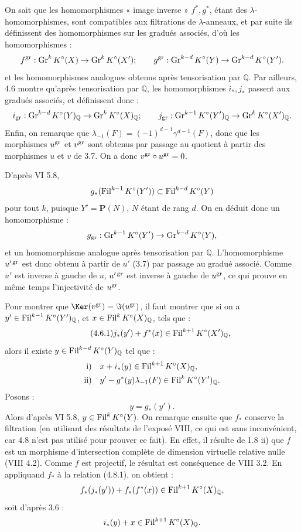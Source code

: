 On sait que les homomorphismes « image inverse » \(f^*,g^*\), étant des \(\lambda\)-homomorphismes, sont compatibles aux filtrations de \(\lambda\)-anneaux, et par suite ils définissent des homomorphismes sur les gradués associés, d'où les homomorphismes :
\[
  f^{\operatorname{gr}}:\operatorname{Gr}^kK^\circ(X)\to\operatorname{Gr}^kK^\circ(X');
  \qquad
  g^{\operatorname{gr}}:\operatorname{Gr}^{k-d}K^\circ(Y)\to\operatorname{Gr}^{k-d}K^\circ(Y').
\]
et les homomorphismes analogues obtenus après tensorisation par \(\mathbb Q\). Par ailleurs, 4.6 montre qu'après tensorisation par \(\mathbb Q\), les homomorphismes \(i_*,j_*\) passent aux gradués associés, et définissent
donc :
\[
  i_{\operatorname{gr}}:\operatorname{Gr}^{k-d}K^\circ(Y)_{\mathbb Q}
  \to \operatorname{Gr}^{k}K^\circ(X)_{\mathbb Q};
  \qquad
  j_{\operatorname{gr}}:\operatorname{Gr}^{k-1}K^\circ(Y')_{\mathbb Q}
  \to \operatorname{Gr}^{k}K^\circ(X')_{\mathbb Q}.
\]
Enfin, on remarque que \(\lambda_{-1}(F)=(-1)^{d-1}\gamma^{d-1}(F)\), donc que les morphismes \(u^{\operatorname{gr}}\) et \(v^{\operatorname{gr}}\) sont obtenus par passage au quotient à partir des morphismes \(u\) et \(v\) de 3.7. On a donc \(v^{\operatorname{gr}}\circ u^{\operatorname{gr}}=0\).

D'après VI 5.8,
\[
  g_*(\operatorname{Fil}^{k-1}K^\circ(Y'))\subset \operatorname{Fil}^{k-d}K^\circ(Y)
\]
pour tout \(k\), puisque \(Y'=\mathbf P(N)\), \(N\) étant de rang \(d\). On en déduit donc un homomorphisme :
\[
  g_{\operatorname{gr}}:\operatorname{Gr}^{k-1}K^\circ(Y')
  \to\operatorname{Gr}^{k-d}K^\circ(Y),
\]
et un homomorphisme analogue après tensorisation par \(\mathbb Q\). L'homomorphisme \(u'^{\operatorname{gr}}\) est donc obtenu à partir de \(u'\) (3.7) par passage au gradué associé. Comme \(u'\) est inverse à gauche de \(u\), \(u'^{\operatorname{gr}}\) est inverse à gauche de \(u^{\operatorname{gr}}\), ce qui prouve en même temps l'injectivité de \(u^{\operatorname{gr}}\).

Pour montrer que \(\Ker(v^{\gr})=\Im(u^{\gr})\), il faut montrer que si on a \(y'\in\operatorname{Fil}^{k-1}K^\circ(Y')_{\mathbb Q}\), et \(x\in\operatorname{Fil}^kK^\circ(X)_{\mathbb Q}\), tels que :
\begin{equation}\tag{4.6.1}
  j_*(y')+f^*(x)\in\operatorname{Fil}^{k+1}K^\circ(X')_{\mathbb Q},
\end{equation}
alors il existe \(y\in\operatorname{Fil}^{k-d}K^\circ(Y)_{\mathbb Q}\) tel que :
\[
\begin{aligned}
\text{i)}\quad &x+i_*(y)\in\operatorname{Fil}^{k+1}K^\circ(X)_{\mathbb Q},\\
\text{ii)}\quad &y'-g^*(y)\lambda_{-1}(F)\in\operatorname{Fil}^{k}K^\circ(Y')_{\mathbb Q}.
\end{aligned}
\]
Posons :
\[
  y=g_*(y').
\]
Alors d'après VI 5.8, \(y\in\operatorname{Fil}^{k}K^\circ(Y)\). On remarque ensuite que \(f_*\) conserve la filtration (en utilisant des résultats de l'exposé VIII, ce qui est sans inconvénient, car 4.8 n'est pas utilisé pour prouver ce fait). En effet, il résulte de 1.8 ii) que \(f\) est un morphisme d'intersection complète de dimension virtuelle relative nulle (VIII 4.2). Comme \(f\) est projectif, le résultat est conséquence de VIII 3.2. En appliquand \(f_*\) à la relation (4.8.1), on
obtient :
\[
  f_*(j_*(y'))+f_*(f^*(x))\in\operatorname{Fil}^{k+1}K^\circ(X)_{\mathbb Q},
\]
soit d'après 3.6 :
\[
  i_*(y)+x\in\operatorname{Fil}^{k+1}K^\circ(X)_{\mathbb Q}.
\]

